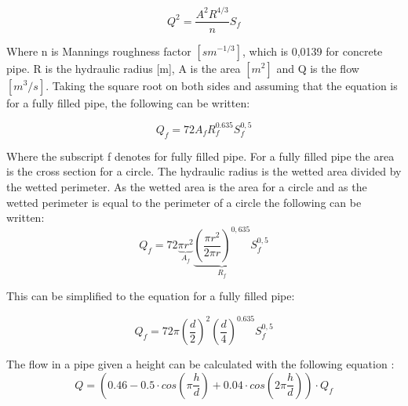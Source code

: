 \begin{equation}
	Q^2=\frac{A^2R^{4/3}}{n}S_f			
\end{equation}

Where n is Mannings roughness factor $[sm^{-1/3}]$, which is 0,0139 for concrete pipe. R is the hydraulic radius [m], A is the area $[m^2]$ and Q is the flow $[m^3/s]$. Taking the square root on both sides and assuming that the equation is for a fully filled pipe, the following can be written:

\begin{equation}
  Q_{f} = 72 A_{f} R_{f}^{0.635}S_f^{0,5} 
\end{equation}

Where the subscript f denotes for fully filled pipe. For a fully filled pipe the area is the cross section for a circle. The hydraulic radius is the wetted area divided by the wetted perimeter. As the wetted area is the area for a circle and as the wetted perimeter is equal to the perimeter of a circle the following can be written: 
\begin{equation}
		Q_{f}= 72 \underbrace{\pi r^2}_{A_{f}}\underbrace{\left(\frac{\pi r^2}{2\pi r}\right)^{0,635} }_{R_{f}}S_f^{0,5} 
\end{equation}

This can be simplified to the equation for a fully filled pipe:

\begin{equation}%
	Q_{f} =72\pi\left(\frac{d}{2}\right)^2\left(\frac{d}{4}\right)^{0.635} S_f^{0,5}%
\end{equation}


The flow in a pipe given a height can be calculated with the following equation \cite{ikke_stationear}:
\begin{equation}%
 	Q = \left(0.46-0.5 \cdot cos\left(\pi \frac{h}{d}\right)+0.04\cdot cos\left(2\pi\frac{h}{d}\right)\right)\cdot Q_f
\end{equation}

